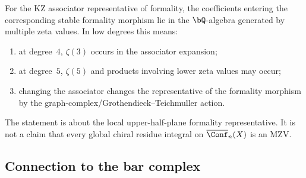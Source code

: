 \begin{proposition}
\label{prop:kontsevich-mzv}
For the KZ associator representative of formality, the coefficients
entering the corresponding stable formality morphism lie in the
$\bQ$-algebra generated by multiple zeta values. In low degrees this
means:
\begin{enumerate}[label=\textup{(\roman*)}]
\item at degree~$4$, $\zeta(3)$ occurs in the associator expansion;
\item at degree~$5$, $\zeta(5)$ and products involving lower zeta
 values may occur;
\item changing the associator changes the representative of the
 formality morphism by the graph-complex/Grothendieck--Teichmuller
 action.
\end{enumerate}
The statement is about the local upper-half-plane formality
representative. It is not a claim that every global chiral residue
integral on $\overline{\Conf}_n(X)$ is an MZV.
\end{proposition}


\subsection{Connection to the bar complex}

